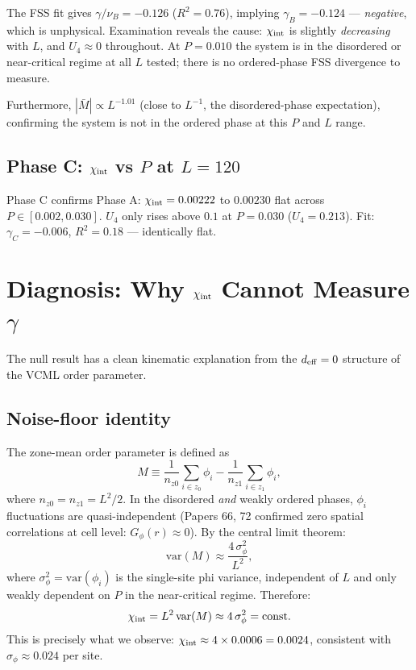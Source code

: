 \documentclass[11pt,a4paper]{article}
\begin{document}
The FSS fit gives $\gamma/\nu_B = -0.126$ ($R^2 = 0.76$), implying
$\gamma_B = -0.124$ --- \emph{negative}, which is unphysical.  Examination reveals
the cause: $\chi_{\rm int}$ is slightly \emph{decreasing} with $L$, and $U_4 \approx 0$
throughout.  At $P = 0.010$ the system is in the disordered or near-critical regime
at all $L$ tested; there is no ordered-phase FSS divergence to measure.

Furthermore, $|\bar{M}| \propto L^{-1.01}$ (close to $L^{-1}$, the disordered-phase
expectation), confirming the system is not in the ordered phase at this $P$ and
$L$ range.

\subsection{Phase C: $\chi_{\rm int}$ vs $P$ at $L=120$}

Phase C confirms Phase A: $\chi_{\rm int} = 0.00222$ to $0.00230$ flat across
$P \in [0.002, 0.030]$.  $U_4$ only rises above $0.1$ at $P = 0.030$
($U_4 = 0.213$).  Fit: $\gamma_C = -0.006$, $R^2 = 0.18$ --- identically flat.

\section{Diagnosis: Why $\chi_{\rm int}$ Cannot Measure $\gamma$}

The null result has a clean kinematic explanation from the $d_{\rm eff} = 0$
structure of the VCML order parameter.

\subsection{Noise-floor identity}

The zone-mean order parameter is defined as
\begin{equation}
  M \equiv \frac{1}{n_{z0}} \sum_{i \in z_0} \phi_i
           - \frac{1}{n_{z1}} \sum_{i \in z_1} \phi_i,
\end{equation}
where $n_{z0} = n_{z1} = L^2/2$.  In the disordered \emph{and} weakly ordered phases,
$\phi_i$ fluctuations are quasi-independent (Papers 66, 72 confirmed zero spatial
correlations at cell level: $G_\phi(r) \approx 0$).  By the central limit theorem:
\begin{equation}
  \mathrm{var}(M) \approx \frac{4\,\sigma_\phi^2}{L^2},
\end{equation}
where $\sigma_\phi^2 = \mathrm{var}(\phi_i)$ is the single-site phi variance,
independent of $L$ and only weakly dependent on $P$ in the near-critical regime.
Therefore:
\begin{equation}
  \chi_{\rm int} = L^2 \,\mathrm{var}(M) \approx 4\,\sigma_\phi^2 = \mathrm{const}.
\end{equation}
This is precisely what we observe: $\chi_{\rm int} \approx 4 \times 0.0006 = 0.0024$,
consistent with $\sigma_\phi \approx 0.024$ per site.
\end{document}
